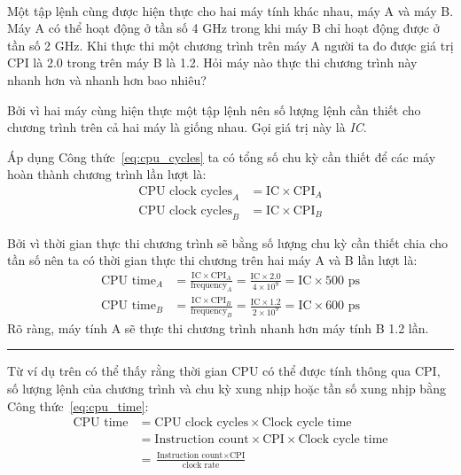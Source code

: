 \begin{exmp}
\hrulefill\\
Một tập lệnh cùng được hiện thực cho hai máy tính khác nhau, máy A và máy B. Máy A có thể hoạt động ở tần số 4 GHz trong khi máy B chỉ hoạt động được ở tần số 2 GHz. Khi thực thi một chương trình trên máy A người ta đo được giá trị CPI là 2.0 trong trên máy B là 1.2. Hỏi máy nào thực thi chương trình này nhanh hơn và nhanh hơn bao nhiêu?
\end{exmp}
\begin{answ}
Bởi vì hai máy cùng hiện thực một tập lệnh nên số lượng lệnh cần thiết cho chương trình trên cả hai máy là giống nhau. Gọi giá trị này là \emph{IC}.

Áp dụng Công thức~\ref{eq:cpu_cycles} ta có tổng số chu kỳ cần thiết để các máy hoàn thành chương trình lần lượt là:
\begin{align*}
\text{CPU clock cycles}_A &= \text{IC} \times \text{CPI}_A\\ 
\text{CPU clock cycles}_B &= \text{IC} \times \text{CPI}_B
\end{align*}

Bởi vì thời gian thực thi chương trình sẽ bằng số lượng chu kỳ cần thiết chia cho tần số nên ta có thời gian thực thi chương trên hai máy A và B lần lượt là:
\begin{align*}
\text{CPU time}_A &= \frac{\text{IC} \times \text{CPI}_A}{\text{frequency}_A} = \frac{\text{IC} \times 2.0}{4\times 10^9} = \text{IC} \times 500\text{ ps}\\ 
\text{CPU time}_B &= \frac{\text{IC} \times \text{CPI}_B}{\text{frequency}_B} = \frac{\text{IC} \times 1.2}{2\times 10^9} = \text{IC} \times 600\text{ ps}
\end{align*}
Rõ ràng, máy tính A sẽ thực thi chương trình nhanh hơn máy tính B 1.2 lần.\\
\hrule
\end{answ}

Từ ví dụ trên có thể thấy rằng thời gian CPU có thể được tính thông qua CPI, số lượng lệnh của chương trình và chu kỳ xung nhịp hoặc tần số xung nhịp bằng Công thức~\ref{eq:cpu_time}:
\begin{align}
\label{eq:cpu_time}
	\text{CPU time} &= \text{CPU clock cycles} \times \text{Clock cycle time} \nonumber \\
	&= \text{Instruction count}\times \text{CPI} \times \text{Clock cycle time}  \\
	& = \frac{\text{Instruction count}\times \text{CPI}}{\text{clock rate}} \nonumber
\end{align}

